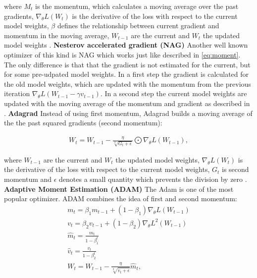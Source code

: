 where $M_{t}$ is the momentum, which calculates a moving average over the past gradients, $\nabla_{\theta}L(W_{t})$ is the derivative of the loss with respect to the current model weights, $\beta$ defines the relationship between current gradient and momentum in the moving average, $W_{t-1}$ are the current and $W_{t}$ the updated model weights \cite{Ruder2016}.\newline
\newline
\textbf{Nesterov accelerated gradient (NAG)}\newline
Another well known optimizer of this kind is NAG which works just like described in  \ref{eq:moment}. The only difference is that that the gradient is not estimated for the current, but for some pre-udpated model weights. In a first step the gradient is calculated for the old model weights, which are updated with the momentum from the previous iteration $\nabla_{\theta}L( W_{t-1} - \gamma v_{t-1})$. In a second step the current model weights  are updated with the moving average of the momentum and gradient as described in \label{eq:moment} \cite{Ruder2016}.\newline
\newline
\textbf{Adagrad}\newline
Instead of using first momentum, Adagrad builds a moving average of the the past squared gradients (second momentum):

\begin{equation}
  \begin{aligned}
  W_{t} = W_{t-1} - \frac{\eta}{\sqrt[2]{G_{t}+ \epsilon}} \bigodot \nabla_{\theta}L(W_{t-1}),
  \end{aligned}
  \label{eq:Adagrad}
\end{equation}

where  $W_{t-1}$ are the current and $W_{t}$ the updated model weights, $\nabla_{\theta}L(W_{t})$ is the derivative of the loss with respect to the current model weights, $G_{t}$ is second momentum and $\epsilon$ denotes a small quantity which prevents the division by zero  \cite{Ruder2016}.\newline
\newline
\textbf{Adaptive Moment Estimation (ADAM)}\newline
The Adam is one of the most popular optimizer. ADAM combines the idea of first and second momentum: 
\begin{equation}
  \begin{aligned}
   &m_{t} =  \beta_{1} m_{t-1} +  (1-\beta_{1}) \nabla_{\theta}L(W_{t-1}) &\\
    &v_{t} =  \beta_{2} v_{t-1} +  (1-\beta_{2}) \nabla_{\theta}L^{2}(W_{t-1}) &\\
    &\hat{m}_{t} = \frac{m_{t}}{1-\beta_{1}^{t}}&\\
    &\hat{v}_{t} = \frac{v_{t}}{1-\beta_{2}^{t}}&\\
   & W_{t} = W_{t-1} - \frac{\eta}{\sqrt[2]{\hat{v}_{t} + \epsilon}}\hat{m}_{t}, &\\
  \end{aligned}
  \label{eq:moment}
\end{equation}

